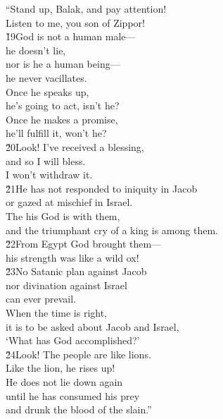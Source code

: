 \begin{poetry}
\poeml ``Stand up, Balak, and pay attention! \\
\poemll    Listen to me, you son of Zippor! \\
\poeml \v{19}God is not a human male--- \\
\poemll    he doesn't lie, \\
\poeml nor is he a human being--- \\
\poemll    he never vacillates. \\
\poeml Once he speaks up, \\
\poemll    he's going to act, isn't he? \\
\poeml Once he makes a promise, \\
\poemll    he'll fulfill it, won't he? \\
\poeml \v{20}Look! I've received a blessing, \\
\poemll    and so I will bless. \\
\poemlll       I won't withdraw it. \\
\poeml \v{21}He has not responded to iniquity in Jacob \\
\poemll    or gazed at mischief in Israel. \\
\poeml The  his God is with them, \\
\poemll    and the triumphant cry of a king is among them. \\
\poeml \v{22}From Egypt God brought them--- \\
\poemll    his strength was like a wild ox! \\
\poeml \v{23}No Satanic plan against Jacob \\
\poemll    nor divination against Israel \\
\poemlll       can ever prevail. \\
\poeml When the time is right, \\
\poemll    it is to be asked about Jacob and Israel, \\
\poemlll       `What has God accomplished?' \\
\poeml \v{24}Look! The people are like lions. \\
\poemll    Like the lion, he rises up! \\
\poeml He does not lie down again \\
\poemll    until he has consumed his prey \\
\poemlll       and drunk the blood of the slain.''
\end{poetry}


